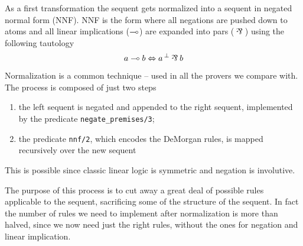 \documentclass[a4paper, 12pt, english]{report}
\begin{document}
As a first transformation the sequent gets normalized into a sequent in negated normal form (NNF).
NNF is the form where all negations are pushed down to atoms and all linear implications ($\multimap$) are expanded into pars ($\llpar$) using the following tautology
$$ a \lolli b \Leftrightarrow \llnot{a} \llpar b $$
Normalization is a common technique -- used in all the provers we compare with.
The process is composed of just two steps
\begin{enumerate}
	\item the left sequent is negated and appended to the right sequent, implemented by the predicate \texttt{negate\_premises/3};
	\item the predicate \texttt{nnf/2}, which encodes the DeMorgan rules, is mapped recursively over the new sequent
\end{enumerate}
This is possible since classic linear logic is symmetric and negation is involutive.

The purpose of this process is to cut away a great deal of possible rules applicable to the sequent, sacrificing some of the structure of the sequent.
In fact the number of rules we need to implement after normalization is more than halved, since we now need just the right rules, without the ones for negation and linear implication.
\end{document}
